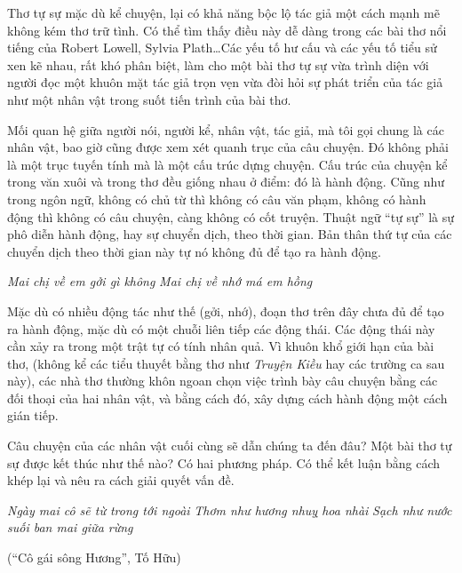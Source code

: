 \documentclass[../main.tex]{subfiles}
\begin{document}
\begin{multicols}{2}
Thơ tự sự mặc dù kể chuyện, lại có khả năng bộc lộ tác giả một cách mạnh mẽ không kém thơ trữ tình. Có thể tìm thấy điều này dễ dàng trong các bài thơ nổi tiếng của Robert Lowell, Sylvia Plath…Các yếu tố hư cấu và các yếu tố tiểu sử xen kẽ nhau, rất khó phân biệt, làm cho một bài thơ tự sự vừa trình diện với người đọc một khuôn mặt tác giả trọn vẹn vừa đòi hỏi sự phát triển của tác giả như một nhân vật trong suốt tiến trình của bài thơ.  
 
Mối quan hệ giữa người nói, người kể, nhân vật, tác giả, mà tôi gọi chung là các nhân vật, bao giờ cũng được xem xét quanh trục của câu chuyện. Đó không phải là một trục tuyến tính mà là một cấu trúc dựng chuyện. Cấu trúc của chuyện kể trong văn xuôi và trong thơ đều giống nhau ở điểm: đó là hành động. Cũng như trong ngôn ngữ, không có chủ từ thì không có câu văn phạm, không có hành động thì không có câu chuyện, càng không có cốt truyện. Thuật ngữ “tự sự” là sự phô diễn hành động, hay sự chuyển dịch, theo thời gian. Bản thân thứ tự của các chuyển dịch theo thời gian này tự nó không đủ để tạo ra hành động.        
\begin{blockquote}
        
\textit{Mai chị về em gởi gì không} 
\textit{Mai chị về nhớ má em hồng} 

\end{blockquote}
 
Mặc dù có nhiều động tác như thế (gởi, nhớ), đoạn thơ trên đây chưa đủ để tạo ra hành động, mặc dù có một chuỗi liên tiếp các động thái. Các động thái này cần xảy ra trong một trật tự có tính nhân quả. Vì khuôn khổ giới hạn của bài thơ, (không kể các tiểu thuyết bằng thơ như \textit{Truyện Kiều} hay các trường ca sau này), các nhà thơ thường khôn ngoan chọn việc trình bày câu chuyện bằng các đối thoại của hai nhân vật, và bằng cách đó, xây dựng cách hành động một cách gián tiếp.  
 
Câu chuyện của các nhân vật cuối cùng sẽ dẫn chúng ta đến đâu? Một bài thơ tự sự được kết thúc như thế nào? Có hai phương pháp. Có thể kết luận bằng cách khép lại và nêu ra cách giải quyết vấn đề.  
\begin{blockquote}
        
\textit{Ngày mai cô sẽ từ trong tới ngoài}        
\textit{Thơm như hương nhuỵ hoa nhài}        
\textit{Sạch như nước suối ban mai giữa rừng}        
        
(“Cô gái sông Hương”, Tố Hữu) 

\end{blockquote}
 

\end{multicols}
\end{document}
